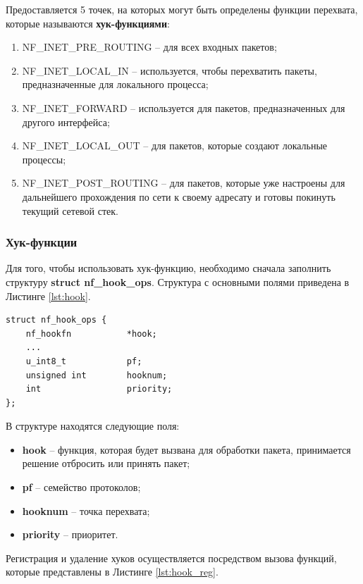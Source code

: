 Предоставляется 5 точек, на которых могут быть определены функции перехвата, которые называются \textbf{хук-функциями}:
\begin{enumerate}
	\item NF\_INET\_PRE\_ROUTING – для всех входных пакетов;
	\item NF\_INET\_LOCAL\_IN – используется, чтобы перехватить пакеты, предназначенные для локального процесса;
	\item NF\_INET\_FORWARD – используется для пакетов, предназначенных для другого интерфейса;
	\item NF\_INET\_LOCAL\_OUT – для пакетов, которые создают локальные процессы;
	\item NF\_INET\_POST\_ROUTING – для пакетов, которые уже настроены для дальнейшего прохождения по сети к своему адресату и готовы покинуть текущий сетевой стек. \newline
\end{enumerate}

\subsubsection{Хук-функции}
Для того, чтобы использовать хук-функцию, необходимо сначала заполнить структуру \textbf{struct nf\_hook\_ops}. Структура с основными полями приведена в Листинге \ref{lst:hook}.

\begin{lstlisting}[caption = {struct nf\_hook\_ops}, label=lst:hook]
struct nf_hook_ops {
	nf_hookfn			*hook;
	...
	u_int8_t			pf;
	unsigned int		hooknum;
	int					priority;
};
\end{lstlisting}

В структуре находятся следующие поля:
\begin{itemize}
	\item \textbf{hook} -- функция, которая будет вызвана для обработки пакета, принимается решение отбросить или принять пакет;
	
	\item \textbf{pf} -- семейство протоколов;
	
	\item \textbf{hooknum} -- точка перехвата;
	
	\item \textbf{priority} -- приоритет. \\
\end{itemize}

Регистрация и удаление хуков осуществляется посредством вызова функций, которые представлены в Листинге \ref{lst:hook_reg}.

